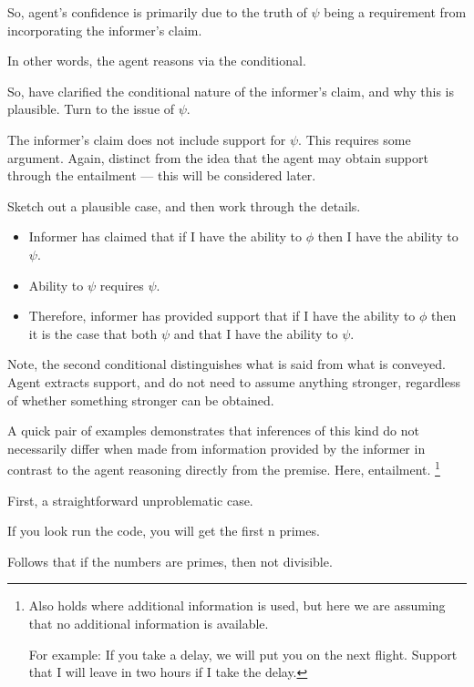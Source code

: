 \documentclass[10pt]{article}
\newcommand{\hozlinedash}[0]{%
  \noindent\hdashrule[0.5ex][c]{\textwidth}{.1pt}{2.5pt}
}
\begin{document}
So, agent's confidence is primarily due to the truth of \(\psi\) being a requirement from incorporating the informer's claim.

In other words, the agent reasons via the conditional.

\hozlinedash

So, have clarified the conditional nature of the informer's claim, and why this is plausible.
Turn to the issue of \(\psi\).

\hozlinedash

The informer's claim does not include support for \(\psi\).
This requires some argument.
Again, distinct from the idea that the agent may obtain support through the entailment --- this will be considered later.

Sketch out a plausible case, and then work through the details.

\begin{itemize}
\item Informer has claimed that if I have the ability to \(\phi\) then I have the ability to \(\psi\).
\item Ability to \(\psi\) requires \(\psi\).
\item Therefore, informer has provided support that if I have the ability to \(\phi\) then it is the case that both \(\psi\) and that I have the ability to \(\psi\).
\end{itemize}

Note, the second conditional distinguishes what is said from what is conveyed.
Agent extracts support, and do not need to assume anything stronger, regardless of whether something stronger can be obtained.

A quick pair of examples demonstrates that inferences of this kind do not necessarily differ when made from information provided by the informer in contrast to the agent reasoning directly from the premise.
Here, entailment.\nolinebreak
\footnote{
  Also holds where additional information is used, but here we are assuming that no additional information is available.

  For example:
  If you take a delay, we will put you on the next flight.
  Support that I will leave in two hours if I take the delay.
}


First, a straightforward unproblematic case.

If you look run the code, you will get the first n primes.

Follows that if the numbers are primes, then not divisible.
\end{document}
